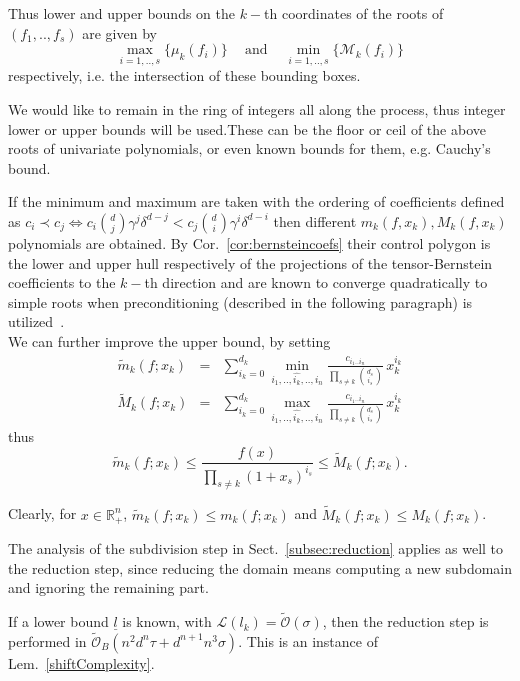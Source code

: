 \documentclass{sig-alternate}
\newcommand{\ds}{\displaystyle}
\newcommand{\dott}{{..}}
\def\RR{\mathbb{R}}
\newcommand{\sO}{\ensuremath{\widetilde{\mathcal{O}}}\xspace}
\newcommand{\sOB}{\ensuremath{\widetilde{\mathcal{O}}_B}\xspace}
\newcommand{\uvec}[1]{\underline{#1}}
\newcommand{\bitsize}[1]{\ensuremath{\mathcal{L}\left( #1 \right)}\xspace}
\begin{document}
Thus lower and upper bounds on the $k-$th coordinates of the roots of
$(f_1,\dott,f_s)$ are given by 
\begin{equation}  \label{systembounds}
\max_{i=1,\dott,s}\{\mu_k(f_i) \} \ \ \ \ \text{ and }\ \ \  \
\min_{i=1,\dott,s}\{\mathcal M_k(f_i) \}
\end{equation}
respectively, i.e. the intersection of these bounding boxes.

We would like to remain in the ring of integers all along the process,
thus integer lower or upper bounds will be used.These can be the
floor or ceil of the above roots of univariate polynomials, or even
known bounds for them, e.g. Cauchy's bound.

If the minimum and maximum are taken with the ordering of coefficients
defined as $ c_i \prec c_j \iff c_i\binom{d}{j}\gamma^j\delta^{d-j} <
c_j\binom{d}{i}\gamma^i\delta^{d-i} $ then different $m_k(f,x_k),
M_k(f,x_k)$ polynomials are obtained. By Cor.~\ref{cor:bernsteincoefs}
their control polygon is the lower and upper hull respectively of the
projections of the tensor-Bernstein coefficients to the $k-$th
direction and are known to converge quadratically to simple roots when
preconditioning (described in the following paragraph)
is utilized~\cite[Cor.~5.3]{mp:smspe-05}.\\


We can further improve the upper bound, by setting
  \begin{eqnarray*}
  \widetilde m_k (f ; x_k) & = & \sum_{i_k = 0}^{d_k}
  \min_{i_1,..,\widehat{i_k},.., i_n } \frac{c_{i_1 \dott
  i_n}}{\prod_{s\ne k}\binom{d_s}{i_s}} \, x_k^{i_k} \\ \widetilde M_k
  (f ; x_k) & = & \sum_{i_k = 0}^{d_k} \max_{i_1,..,\widehat{i_k},..,
  i_n } \frac{c_{i_1 \dott i_n}}{\prod_{s\ne k}\binom{d_s}{i_s}} \,
  x_k^{i_k}
  \end{eqnarray*}
thus
\[  \widetilde m_k (f ; x_k) \le \frac{ f ( x)}{\ds \prod_{s\ne k}  (1+ x_s)^{i_s} } \le \widetilde M_k (f ; x_k)  . \]

Clearly, for $x\in\RR^n_+$, $\widetilde m_k(f;x_k)\leq m_k(f;x_k) $ and $\widetilde M_k(f;x_k) \leq M_k(f;x_k)$.
\fi


 The analysis of the
subdivision step in Sect.~\ref{subsec:reduction} applies as well to the reduction step,
since reducing the domain means computing a new subdomain and ignoring the
remaining part.

If a lower bound $\uvec l$ is known, with $ \bitsize{l_k}=\sO(\sigma)$, then
the reduction step is 
performed in $\sOB(  n^2 d^n \tau + d^{n+1} n^3 \sigma )$. This is an
instance of Lem.~\ref{shiftComplexity}. 
\end{document}
